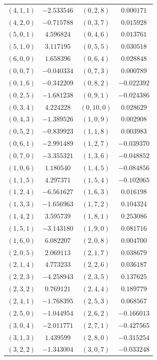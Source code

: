 \begin{table}
\begin{tabular}{cc@{\qquad}cc}
$(4,1,1)$ & $-2.533546$ & $(0,2,8)$ & $0.000171$ \\
$(4,2,0)$ & $-0.715788$ & $(0,3,7)$ & $0.015928$ \\
$(5,0,1)$ & $4.596824$ & $(0,4,6)$ & $0.013761$ \\
$(5,1,0)$ & $3.117195$ & $(0,5,5)$ & $0.030518$ \\
$(6,0,0)$ & $1.658396$ & $(0,6,4)$ & $0.028848$ \\
$(0,0,7)$ & $-0.040334$ & $(0,7,3)$ & $0.000789$ \\
$(0,1,6)$ & $-0.342209$ & $(0,8,2)$ & $-0.022392$ \\
$(0,2,5)$ & $-1.681238$ & $(0,9,1)$ & $-0.024386$ \\
$(0,3,4)$ & $4.224228$ & $(0,10,0)$ & $0.028629$ \\
$(0,4,3)$ & $-1.389526$ & $(1,0,9)$ & $0.002908$ \\
$(0,5,2)$ & $-0.839923$ & $(1,1,8)$ & $0.003983$ \\
$(0,6,1)$ & $-2.991489$ & $(1,2,7)$ & $-0.039370$ \\
$(0,7,0)$ & $-3.355321$ & $(1,3,6)$ & $-0.048852$ \\
$(1,0,6)$ & $1.180540$ & $(1,4,5)$ & $-0.084856$ \\
$(1,1,5)$ & $4.297371$ & $(1,5,4)$ & $-0.102065$ \\
$(1,2,4)$ & $-6.561627$ & $(1,6,3)$ & $0.016198$ \\
$(1,3,3)$ & $-1.656963$ & $(1,7,2)$ & $0.104324$ \\
$(1,4,2)$ & $3.595739$ & $(1,8,1)$ & $0.253086$ \\
$(1,5,1)$ & $-3.143180$ & $(1,9,0)$ & $0.081716$ \\
$(1,6,0)$ & $6.082207$ & $(2,0,8)$ & $0.004700$ \\
$(2,0,5)$ & $2.069113$ & $(2,1,7)$ & $0.038679$ \\
$(2,1,4)$ & $4.773233$ & $(2,2,6)$ & $0.036187$ \\
$(2,2,3)$ & $-4.258943$ & $(2,3,5)$ & $0.137625$ \\
$(2,3,2)$ & $0.769121$ & $(2,4,4)$ & $0.189779$ \\
$(2,4,1)$ & $-1.768395$ & $(2,5,3)$ & $0.068567$ \\
$(2,5,0)$ & $-1.044954$ & $(2,6,2)$ & $-0.166013$ \\
$(3,0,4)$ & $-2.011771$ & $(2,7,1)$ & $-0.427565$ \\
$(3,1,3)$ & $1.439599$ & $(2,8,0)$ & $-0.315254$ \\
$(3,2,2)$ & $-1.343004$ & $(3,0,7)$ & $-0.033248$ \\

\end{tabular}
\end{table}
